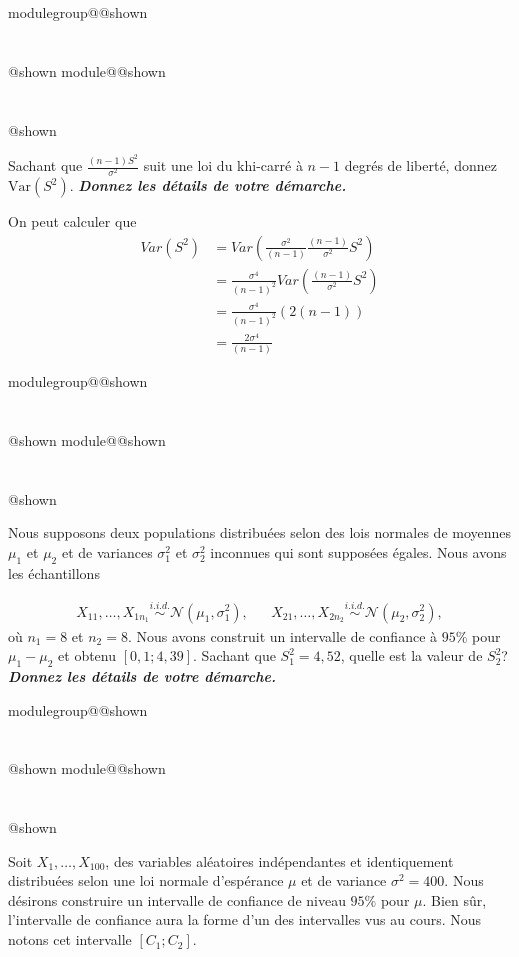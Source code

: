 \documentclass{Evaluation}
\makeatletter
\newcommand{\currentmodulekey}{}
\newcommand{\currentmoduletitle}{}
\newcommand{\currentgroupkey}{}
\newcommand{\currentgrouptitle}{}
\newcommand{\showmoduleifneeded}{%
  \ifx\currentgroupkey\empty\else
    \expandafter\ifx\csname modulegroup@\currentgroupkey @shown\endcsname\relax
      \section*{\currentgrouptitle}%
      \expandafter\gdef\csname modulegroup@\currentgroupkey @shown\endcsname{1}%
    \fi
  \fi
  \expandafter\ifx\csname module@\currentmodulekey @shown\endcsname\relax
    \section*{\currentmoduletitle}%
    \expandafter\gdef\csname module@\currentmodulekey @shown\endcsname{1}%
  \fi
}
\newenvironment{H23}{\showmoduleifneeded}{}
\makeatother
\begin{document}
\begin{questions}
\begin{H23}
\question {} %
Sachant que $\displaystyle \frac{(n-1)S^2}{\sigma^2}$ suit une loi du khi-carré à $n-1$ degrés de liberté, donnez $\text{Var}(S^2)$. \textbf{\textit{Donnez les détails de votre démarche.}}

\begin{solution}
On peut calculer que 
\begin{align*}
Var(S^2) &= Var\left( \frac{\sigma^2}{(n-1)}\frac{(n-1)}{\sigma^2}S^2 \right)\\
    &= \frac{\sigma^4}{(n-1)^2} Var\left(\frac{(n-1)}{\sigma^2}S^2\right)  \\
    &= \frac{\sigma^4}{(n-1)^2}(2(n-1)) \\
    &= \frac{2\sigma^4}{(n-1)}
\end{align*}
\end{solution}
\end{H23}

\begin{H23}
\question {} %
Nous supposons deux populations distribuées selon des lois normales de moyennes $\mu_1$ et $\mu_2$ et de variances $\sigma^2_1$ et $\sigma^2_2$ inconnues qui sont supposées égales. Nous avons les échantillons

\begin{align*}
X_{11}, \ldots, X_{1n_1} \overset{i.i.d.}{\sim} \mathcal{N}(\mu_1, \sigma^2_1), & & X_{21}, \ldots, X_{2n_2} \overset{i.i.d.}{\sim} \mathcal{N}(\mu_2, \sigma^2_2),
\end{align*}
où $n_1=8$ et $n_2=8$. Nous avons construit un intervalle de confiance à $95\%$ pour $\mu_1-\mu_2$ et obtenu $[0,1; 4,39]$. Sachant que $S^2_1=4,52$, quelle est la valeur de $S^2_2$? \textit{\textbf{Donnez les détails de votre démarche.}}
\end{H23}

\begin{H23}
\question {} %
Soit $X_1,\hdots, X_{100}$, des variables aléatoires indépendantes et identiquement distribuées selon une loi normale d’espérance $\mu$ et de variance $\sigma^2 = 400$. 
Nous désirons construire un intervalle de confiance de niveau $95\%$ pour $\mu$. Bien sûr, l'intervalle de confiance aura la forme d'un des intervalles vus au cours. Nous notons cet intervalle $[C_1;C_2]$.
\end{H23}
\end{questions}
\end{document}
